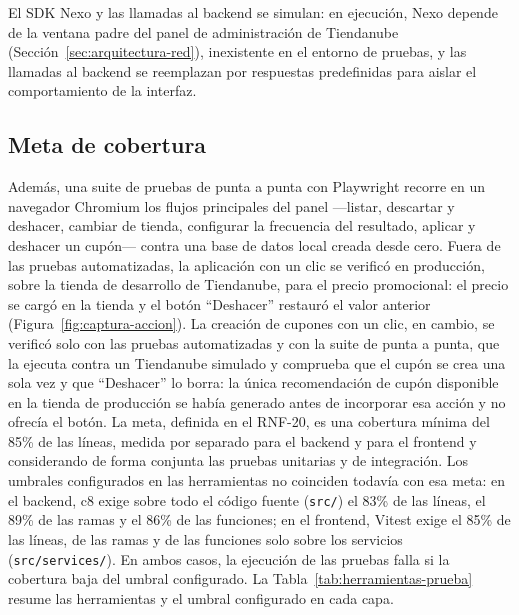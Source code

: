 El SDK Nexo y las llamadas al backend se simulan: en ejecución, Nexo depende de la ventana padre del panel de administración de Tiendanube (Sección~\ref{sec:arquitectura-red}), inexistente en el entorno de pruebas, y las llamadas al backend se reemplazan por respuestas predefinidas para aislar el comportamiento de la interfaz.

\subsection{Meta de cobertura}
\label{sec:meta-cobertura}

Además, una suite de pruebas de punta a punta con Playwright recorre en un navegador Chromium los flujos principales del panel ---listar, descartar y deshacer, cambiar de tienda, configurar la frecuencia del resultado, aplicar y deshacer un cupón--- contra una base de datos local creada desde cero. Fuera de las pruebas automatizadas, la aplicación con un clic se verificó en producción, sobre la tienda de desarrollo de Tiendanube, para el precio promocional: el precio se cargó en la tienda y el botón \enquote{Deshacer} restauró el valor anterior (Figura~\ref{fig:captura-accion}). La creación de cupones con un clic, en cambio, se verificó solo con las pruebas automatizadas y con la suite de punta a punta, que la ejecuta contra un Tiendanube simulado y comprueba que el cupón se crea una sola vez y que \enquote{Deshacer} lo borra: la única recomendación de cupón disponible en la tienda de producción se había generado antes de incorporar esa acción y no ofrecía el botón. La meta, definida en el RNF-20, es una cobertura mínima del 85\% de las líneas, medida por separado para el backend y para el frontend y considerando de forma conjunta las pruebas unitarias y de integración. Los umbrales configurados en las herramientas no coinciden todavía con esa meta: en el backend, c8 exige sobre todo el código fuente (\texttt{src/}) el 83\% de las líneas, el 89\% de las ramas y el 86\% de las funciones; en el frontend, Vitest exige el 85\% de las líneas, de las ramas y de las funciones solo sobre los servicios (\texttt{src/services/}). En ambos casos, la ejecución de las pruebas falla si la cobertura baja del umbral configurado. La Tabla~\ref{tab:herramientas-prueba} resume las herramientas y el umbral configurado en cada capa.

